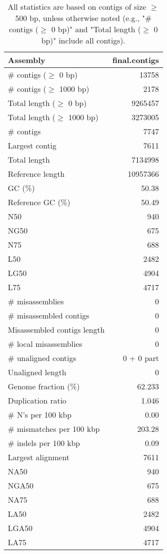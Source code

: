 \documentclass[12pt,a4paper]{article}
\begin{document}
\begin{table}[ht]
\begin{center}
\caption{All statistics are based on contigs of size $\geq$ 500 bp, unless otherwise noted (e.g., "\# contigs ($\geq$ 0 bp)" and "Total length ($\geq$ 0 bp)" include all contigs).}
\begin{tabular}{|l*{1}{|r}|}
\hline
Assembly & final.contigs \\ \hline
\# contigs ($\geq$ 0 bp) & 13758 \\ \hline
\# contigs ($\geq$ 1000 bp) & 2178 \\ \hline
Total length ($\geq$ 0 bp) & 9265457 \\ \hline
Total length ($\geq$ 1000 bp) & 3273005 \\ \hline
\# contigs & 7747 \\ \hline
Largest contig & 7611 \\ \hline
Total length & 7134998 \\ \hline
Reference length & 10957366 \\ \hline
GC (\%) & 50.38 \\ \hline
Reference GC (\%) & 50.49 \\ \hline
N50 & 940 \\ \hline
NG50 & 675 \\ \hline
N75 & 688 \\ \hline
L50 & 2482 \\ \hline
LG50 & 4904 \\ \hline
L75 & 4717 \\ \hline
\# misassemblies & 0 \\ \hline
\# misassembled contigs & 0 \\ \hline
Misassembled contigs length & 0 \\ \hline
\# local misassemblies & 0 \\ \hline
\# unaligned contigs & 0 + 0 part \\ \hline
Unaligned length & 0 \\ \hline
Genome fraction (\%) & 62.233 \\ \hline
Duplication ratio & 1.046 \\ \hline
\# N's per 100 kbp & 0.00 \\ \hline
\# mismatches per 100 kbp & 203.28 \\ \hline
\# indels per 100 kbp & 0.09 \\ \hline
Largest alignment & 7611 \\ \hline
NA50 & 940 \\ \hline
NGA50 & 675 \\ \hline
NA75 & 688 \\ \hline
LA50 & 2482 \\ \hline
LGA50 & 4904 \\ \hline
LA75 & 4717 \\ \hline
\end{tabular}
\end{center}
\end{table}
\end{document}
